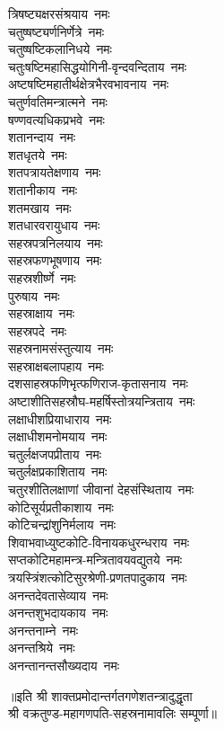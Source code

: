 \begin{multicols}{2}
\begin{flushleft}
त्रिषष्ट्यक्षरसंश्रयाय~नमः\\
चतुष्षष्ट्यर्णनिर्णेत्रे~नमः\\
चतुष्षष्टिकलानिधये~नमः\\
चतुःषष्टिमहासिद्धयोगिनी-वृन्दवन्दिताय~नमः\\
अष्टषष्टिमहातीर्थक्षेत्रभैरव\-भावनाय~नमः\\
चतुर्णवतिमन्त्रात्मने~नमः\\
षण्णवत्यधिकप्रभवे~नमः\\
शतानन्दाय~नमः\\
शतधृतये~नमः\\
शतपत्रायतेक्षणाय~नमः\hfill{}\\
शतानीकाय~नमः\\
शतमखाय~नमः\\
शतधारवरायुधाय~नमः\\
सहस्रपत्रनिलयाय~नमः\\
सहस्रफणभूषणाय~नमः\\
सहस्रशीर्ष्णे~नमः\\
पुरुषाय~नमः\\
सहस्राक्षाय~नमः\\
सहस्रपदे~नमः\\
सहस्रनामसंस्तुत्याय~नमः\hfill{}\\
सहस्राक्षबलापहाय~नमः\\
दशसाहस्रफणिभृत्फणिराज-कृतासनाय~नमः\\
अष्टाशीतिसहस्रौघ-महर्षिस्तोत्रयन्त्रिताय~नमः\\
लक्षाधीशप्रियाधाराय~नमः\\
लक्षाधीशमनोमयाय~नमः\\
चतुर्लक्षजपप्रीताय~नमः\\
चतुर्लक्षप्रकाशिताय~नमः\\
चतुरशीतिलक्षाणां जीवानां देहसंस्थिताय~नमः\\
कोटिसूर्यप्रतीकाशाय~नमः\\
कोटिचन्द्रांशुनिर्मलाय~नमः\hfill{}\\
शिवाभवाध्युष्टकोटि-विनायकधुरन्धराय~नमः\\
सप्तकोटिमहामन्त्र-मन्त्रितावयवद्युतये~नमः\\
त्रयस्त्रिंशत्कोटिसुरश्रेणी-प्रणतपादुकाय~नमः\\
अनन्तदेवतासेव्याय~नमः\\
अनन्तशुभदायकाय~नमः\\
अनन्तनाम्ने~नमः\\
अनन्तश्रिये~नमः\\
अनन्तानन्तसौख्यदाय~नमः\\
\end{flushleft}
\end{multicols}
॥इति श्री शाक्तप्रमोदान्तर्गतगणेशतन्त्रादुद्धृता\\
श्री वक्रतुण्ड-महागणपति-सहस्रनामावलिः सम्पूर्णा॥
